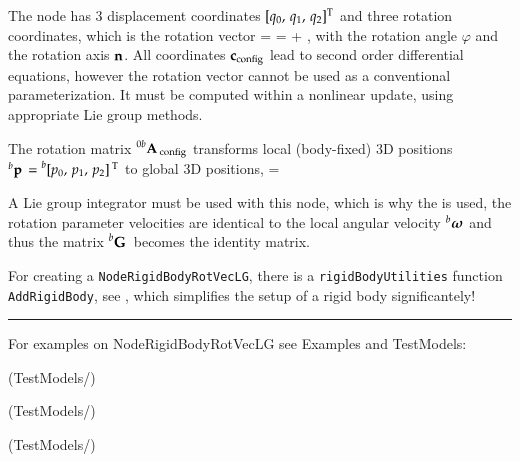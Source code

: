     The node has 3 displacement coordinates $[q_0,\,q_1,\,q_2]^\mathrm{T}$ and three rotation coordinates, which is the rotation vector 
    \be
      \tnu = \varphi \nv = \tnu\cConfig + \tnu\cRef,
    \ee
    with the rotation angle $\varphi$ and the rotation axis $\mathbf{n}$.
    All coordinates $\mathbf{c}_\mathrm{config}$ lead to second order differential equations, however the rotation vector cannot be used as a conventional parameterization. It must be computed within a nonlinear update, using appropriate Lie group methods.

    The rotation matrix $\prescript{0b}{}{\mathbf{A}}\,_\mathrm{config}$ transforms local (body-fixed) 3D positions $\prescript{b}{}{\mathbf{p}}\, = \prescript{b}{}{[p_0,\,p_1,\,p_2]}\,^\mathrm{T}$ to global 3D positions,
    \be
      \cConfig = \cConfig {} 
    \ee
    
    A Lie group integrator must be used with this node, which is why the is used, the 
    rotation parameter velocities are identical to the local angular velocity $\prescript{b}{}{\mbox{\boldmath $\omega$ \unboldmath}\!\!}\,$ and thus the 
    matrix $ \prescript{b}{}{\mathbf{G}}\,$ becomes the identity matrix.
    
    For creating a \texttt{NodeRigidBodyRotVecLG}, there is a \texttt{rigidBodyUtilities} function \texttt{AddRigidBody}, 
    see , which simplifies the setup of a rigid body significantely!
\vspace{6pt}\par\noindent\rule{\textwidth}{0.4pt}
%
\noindent For examples on NodeRigidBodyRotVecLG see Examples and TestModels:
\bi
\item {} (TestModels/)
\item {} (TestModels/)
\item {} (TestModels/)
\ei

